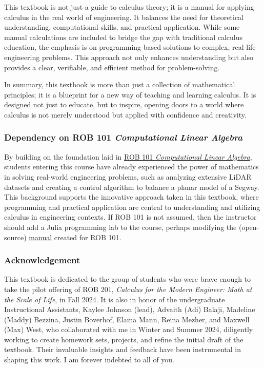 This textbook is not just a guide to calculus theory; it is a manual for applying calculus in the real world of engineering. It balances the need for theoretical understanding, computational skills, and practical application. While some manual calculations are included to bridge the gap with traditional calculus education, the emphasis is on programming-based solutions to complex, real-life engineering problems. This approach not only enhances understanding but also provides a clear, verifiable, and efficient method for problem-solving.

In summary, this textbook is more than just a collection of mathematical principles; it is a blueprint for a new way of teaching and learning calculus. It is designed not just to educate, but to inspire, opening doors to a world where calculus is not merely understood but applied with confidence and creativity.

\subsubsection{Dependency on ROB 101 \textit{Computational Linear Algebra}}

By building on the foundation laid in \href{https://robotics.umich.edu/academics/courses/course-offerings/rob101-fall-2020/}{ROB 101 \textit{Computational Linear Algebra}}, students entering this course have already experienced the power of mathematics in solving real-world engineering problems, such as analyzing extensive LiDAR datasets and creating a control algorithm to balance a planar model of a Segway. This background supports the innovative approach taken in this textbook, where programming and practical application are central to understanding and utilizing calculus in engineering contexts. If ROB 101 is not assumed, then the instructor should add a Julia programming lab to the course, perhaps modifying the (open-source) \href{https://github.com/michiganrobotics/ROB-101-Julia-Programming-Guide}{manual} created for ROB 101.

\subsubsection{Acknowledgement}
This textbook is dedicated to the group of students who were brave enough to take the pilot offering of ROB 201, \textit{Calculus for the Modern Engineer: Math at the Scale of Life}, in Fall 2024. It is also in honor of the undergraduate Instructional Assistants, Kaylee Johnson (lead),  Advaith (Adi) Balaji, Madeline (Maddy) Bezzina, Justin Boverhof, Elaina Mann, Reina Mezher, and Maxwell (Max) West, who collaborated with me in Winter and Summer 2024, diligently working to create homework sets, projects, and refine the initial draft of the textbook. Their invaluable insights and feedback have been instrumental in shaping this work. I am forever indebted to all of you.

